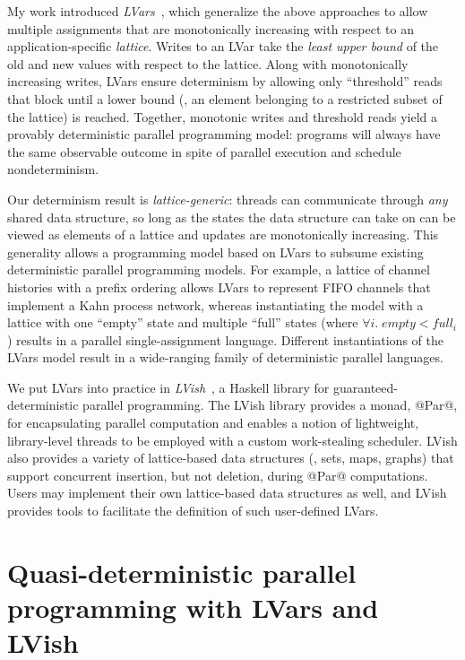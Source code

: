 \documentclass{article}
\begin{document}

My work introduced \emph{LVars}~\cite{LVars-paper, LVars-TR}, which
generalize the above approaches to allow multiple assignments that are
monotonically increasing with respect to an application-specific
\emph{lattice}.  Writes to an LVar take the \emph{least upper bound}
of the old and new values with respect to the lattice.  Along with
monotonically increasing writes, LVars ensure determinism by allowing
only ``threshold'' reads that block until a lower bound (\ie, an
element belonging to a restricted subset of the lattice) is reached.
Together, monotonic writes and threshold reads yield a provably
deterministic parallel programming model: programs will always have
the same observable outcome in spite of parallel execution and
schedule nondeterminism.

Our determinism result is \emph{lattice-generic}: threads can
communicate through \emph{any} shared data structure, so long as the
states the data structure can take on can be viewed as elements of a
lattice and updates are monotonically increasing.  This generality
allows a programming model based on LVars to subsume existing
deterministic parallel programming models.  For example, a lattice of
channel histories with a prefix ordering allows LVars to represent
FIFO channels that implement a Kahn process network, whereas
instantiating the model with a lattice with one ``empty'' state and
multiple ``full'' states (where $\forall{i}.\; \mathit{empty} <
\mathit{full_i}$) results in a parallel single-assignment language.
Different instantiations of the LVars model result in a wide-ranging
family of deterministic parallel languages.

We put LVars into practice in \emph{LVish}~\cite{LVish}, a Haskell
library for guaranteed-deterministic parallel programming.  The LVish
library provides a monad, @Par@, for encapsulating parallel
computation and enables a notion of lightweight, library-level threads
to be employed with a custom work-stealing scheduler.  LVish also
provides a variety of lattice-based data structures (\eg, sets, maps,
graphs) that support concurrent insertion, but not deletion, during
@Par@ computations.  Users may implement their own lattice-based data
structures as well, and LVish provides tools to facilitate the
definition of such user-defined LVars.

\section{Quasi-deterministic parallel programming with LVars and LVish}\label{quasi}
\end{document}
